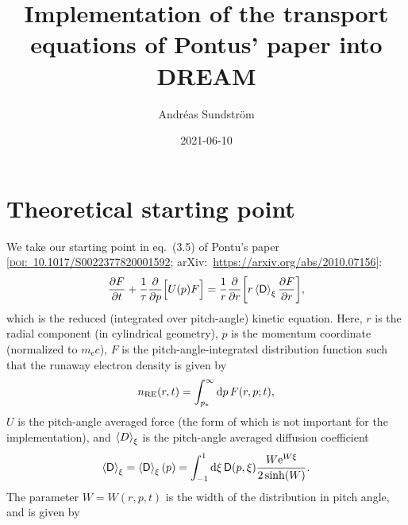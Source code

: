 \documentclass[11pt,a4paper,english
]{article}
\newcommand{\ee}{\mathrm{e}}
\newcommand{\nRE}{\ensuremath{n_{\rm RE}}}
\newcommand{\nuD}{\ensuremath{\nu_{\rm D}}}
\newcommand{\nus}{\ensuremath{\nu_{\rm s}}}
\begin{document}


\title{Implementation of the transport equations of 
 Pontus' paper into DREAM}
\author{Andr\'eas Sundstr\"om}
\date{2021-06-10}

\maketitle



\section{Theoretical starting point}
We take our starting point in eq.~(3.5) of Pontu's paper
[\href{https://doi.org/10.1017/S0022377820001592}{\textsc{doi}:~10.1017/S0022377820001592};
arXiv:~\url{https://arxiv.org/abs/2010.07156}]:
\begin{equation}\label{eq:reduced-kinetic}
\pdv{F}{t}+\frac{1}{\tau}\pdv{p}\qty[\Big.U(p)F]
=\frac{1}{r}\pdv{r}\qty[r\ev{\mathsf{D}}_\xi\pdv{F}{r}],
\end{equation}
which is the reduced (integrated over pitch-angle) kinetic
equation. Here, $r$ is the radial component (in cylindrical geometry),
$p$ is the momentum coordinate (normalized to $m_{\ee}c$), $F$ is the
pitch-angle-integrated distribution function such that the runaway
electron density is given by
\begin{equation}
\nRE(r,t) = \int_{p_*}^{\infty}\dd{p}F(r,p;t),
\end{equation}
$U$ is the pitch-angle averaged force (the form of which is not
important for the implementation),
and $\ev{D}_{\xi}$ is the pitch-angle averaged diffusion coefficient
\begin{equation}\label{eq:ev_D_xi}
\ev{\mathsf{D}}_{\xi}=\ev{\mathsf{D}}_{\xi}(p)
=\int_{-1}^{1}\dd{\xi} \mathsf{D}(p,\xi)\frac{W\ee^{W\xi}}{2\sinh(W)}.
\end{equation}
The parameter $W=W(r,p,t)$ is the width of the distribution in pitch
angle, and is given by
\end{document}
